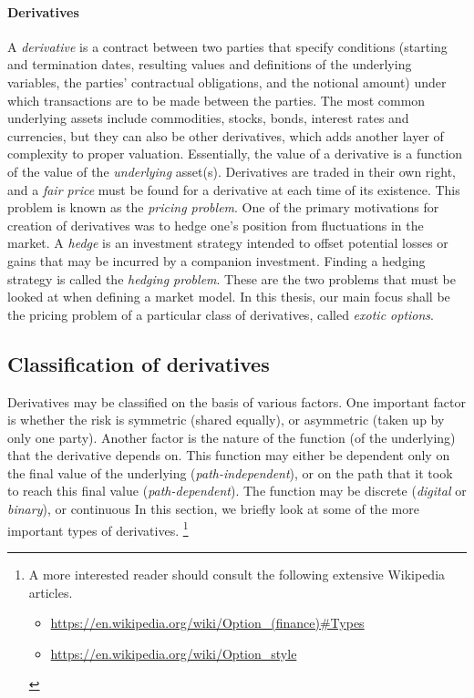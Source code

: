 \paragraph{Derivatives}
A \emph{derivative} is a contract between two parties that specify conditions (starting and termination dates, resulting values and definitions of the underlying variables, the parties' contractual obligations, and the notional amount) under which transactions are to be made between the parties. The most common underlying assets include commodities, stocks, bonds, interest rates and currencies, but they can also be other derivatives, which adds another layer of complexity to proper valuation. Essentially, the value of a derivative is a function of the value of the \emph{underlying} asset(s). Derivatives are traded in their own right, and a \emph{fair price} must be found for a derivative at each time of its existence. This problem is known as the \emph{pricing problem}. One of the primary motivations for creation of derivatives was to hedge one's position from fluctuations in the market. A \emph{hedge} is an investment strategy intended to offset potential losses or gains that may be incurred by a companion investment. Finding a hedging strategy is called the \emph{hedging problem}. These are the two problems that must be looked at when defining a market model. In this thesis, our main focus shall be the pricing problem of a particular class of derivatives, called \emph{exotic options}.


\subsection{Classification of derivatives}
\label{subsec:intro-derivative-classification}

Derivatives may be classified on the basis of various factors. One important factor is whether the risk is symmetric (shared equally), or asymmetric (taken up by only one party). Another factor is the nature of the function (of the underlying) that the derivative depends on. This function may either be dependent only on the final value of the underlying (\emph{path-independent}), or on the path that it took to reach this final value (\emph{path-dependent}). The function may be discrete (\emph{digital} or \emph{binary}), or continuous In this section, we briefly look at some of the more important types of derivatives. \footnote{
	A more interested reader should consult the following extensive Wikipedia articles.
	\begin{itemize}
		\item \url{https://en.wikipedia.org/wiki/Option_(finance)\#Types}
		\item \url{https://en.wikipedia.org/wiki/Option_style}
	\end{itemize}
}


